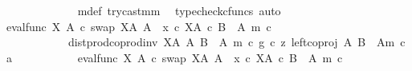\begin{isabellebody}
\ \ \ \ \ \ \ \ \ \ \ \ \isamarkupfalse%
\ m{\isacharunderscore}{\kern0pt}def{\isacharparenleft}{\kern0pt}{}{\isacharparenright}{\kern0pt}\ try{\isacharunderscore}{\kern0pt}cast{\isacharunderscore}{\kern0pt}m{\isacharunderscore}{\kern0pt}m\ \isamarkupfalse%
\ {\isacharparenleft}{\kern0pt}typecheck{\isacharunderscore}{\kern0pt}cfuncs{\isacharcomma}{\kern0pt}\ auto{\isacharparenright}{\kern0pt}\isanewline
\ \ \ \ \ \ \ \ \ \ \isamarkupfalse%
\ \isamarkupfalse%
\ {\isachardoublequoteopen}{\isacharparenleft}{\kern0pt}eval{\isacharunderscore}{\kern0pt}func\ X\ A\ {\isasymcirc}\isactrlsub c\ swap\ {\isacharparenleft}{\kern0pt}X\isactrlbsup A\isactrlesup {\isacharparenright}{\kern0pt}\ A{\isacharparenright}{\kern0pt}\ {\isasymamalg}\ {\isacharparenleft}{\kern0pt}x\ {\isasymcirc}\isactrlsub c\ {\isasymbeta}\isactrlbsub X\isactrlbsup A\isactrlesup \ {\isasymtimes}\isactrlsub c\ {\isacharparenleft}{\kern0pt}B\ {\isasymsetminus}\ {\isacharparenleft}{\kern0pt}A{\isacharcomma}{\kern0pt}\ m{\isacharparenright}{\kern0pt}{\isacharparenright}{\kern0pt}\isactrlesub {\isacharparenright}{\kern0pt}\ {\isasymcirc}\isactrlsub c\isanewline
\ \ \ \ \ \ \ \ \ \ \ \ dist{\isacharunderscore}{\kern0pt}prod{\isacharunderscore}{\kern0pt}coprod{\isacharunderscore}{\kern0pt}inv\ {\isacharparenleft}{\kern0pt}X\isactrlbsup A\isactrlesup {\isacharparenright}{\kern0pt}\ A\ {\isacharparenleft}{\kern0pt}B\ {\isasymsetminus}\ {\isacharparenleft}{\kern0pt}A{\isacharcomma}{\kern0pt}\ m{\isacharparenright}{\kern0pt}{\isacharparenright}{\kern0pt}\ {\isasymcirc}\isactrlsub c\ {\isasymlangle}g\ {\isasymcirc}\isactrlsub c\ z{\isacharcomma}{\kern0pt}\ left{\isacharunderscore}{\kern0pt}coproj\ A\ {\isacharparenleft}{\kern0pt}B\ {\isasymsetminus}\ {\isacharparenleft}{\kern0pt}A{\isacharcomma}{\kern0pt}m{\isacharparenright}{\kern0pt}{\isacharparenright}{\kern0pt}\ {\isasymcirc}\isactrlsub c\ a{\isasymrangle}\isanewline
\ \ \ \ \ \ \ \ \ \ {\isacharequal}{\kern0pt}\ {\isacharparenleft}{\kern0pt}eval{\isacharunderscore}{\kern0pt}func\ X\ A\ {\isasymcirc}\isactrlsub c\ swap\ {\isacharparenleft}{\kern0pt}X\isactrlbsup A\isactrlesup {\isacharparenright}{\kern0pt}\ A{\isacharparenright}{\kern0pt}\ {\isasymamalg}\ {\isacharparenleft}{\kern0pt}x\ {\isasymcirc}\isactrlsub c\ {\isasymbeta}\isactrlbsub X\isactrlbsup A\isactrlesup \ {\isasymtimes}\isactrlsub c\ {\isacharparenleft}{\kern0pt}B\ {\isasymsetminus}\ {\isacharparenleft}{\kern0pt}A{\isacharcomma}{\kern0pt}\ m{\isacharparenright}{\kern0pt}{\isacharparenright}{\kern0pt}\isactrlesub {\isacharparenright}{\kern0pt}\ {\isasymcirc}\isactrlsub c\isanewline

\end{isabellebody}

